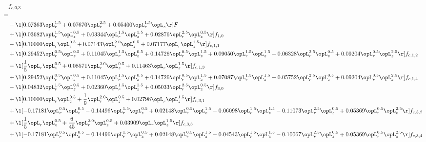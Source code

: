 \begin{alignat}{2} 
\label{eq:f_03_2} 
& f_{c,0,3} \nonumber \\ 
 = \\ 
& - \l[  0.07363 \opL_r^{1.5} +  0.07670 \opL_r^{2.5} +  0.05400 \opL_r^{1.5} \opL_z  \r] F \nonumber \\ 
& + \l[  0.03682 \opL_r^{1.5} \opL_z^{0.5} +  0.03344 \opL_r^{1.5} \opL_z^{1.5} +  0.02876 \opL_r^{2.5} \opL_z^{0.5}  \r] f_{1,0} \nonumber \\ 
& - \l[  0.10000 \opL_r \opL_z^{0.5} +  0.07143 \opL_r^{2.0} \opL_z^{0.5} +  0.07177 \opL_r \opL_z^{1.5}  \r] f_{c,1,1} \nonumber \\ 
& + \l[  0.29452 \opL_r^{0.5} \opL_z^{0.5} +  0.11045 \opL_r^{1.5} \opL_z^{0.5} +  0.14726 \opL_r^{0.5} \opL_z^{1.5} +  0.09050 \opL_r^{1.5} \opL_z^{1.5} +  0.06328 \opL_r^{2.5} \opL_z^{0.5} +  0.09204 \opL_r^{0.5} \opL_z^{2.5}  \r] f_{c,1,2} \nonumber \\ 
& - \l[ \frac{1}{5} \opL_r \opL_z^{0.5} +  0.08571 \opL_r^{2.0} \opL_z^{0.5} +  0.11463 \opL_r \opL_z^{1.5}  \r] f_{c,1,3} \nonumber \\ 
& + \l[  0.29452 \opL_r^{0.5} \opL_z^{0.5} +  0.11045 \opL_r^{1.5} \opL_z^{0.5} +  0.14726 \opL_r^{0.5} \opL_z^{1.5} +  0.07087 \opL_r^{1.5} \opL_z^{1.5} +  0.05752 \opL_r^{2.5} \opL_z^{0.5} +  0.09204 \opL_r^{0.5} \opL_z^{2.5}  \r] f_{c,1,4} \nonumber \\ 
& - \l[  0.04832 \opL_r^{1.5} \opL_z^{0.5} +  0.02360 \opL_r^{1.5} \opL_z^{1.5} +  0.05033 \opL_r^{2.5} \opL_z^{0.5}  \r] f_{3,0} \nonumber \\ 
& + \l[  0.10000 \opL_r \opL_z^{0.5} + \frac{1}{9} \opL_r^{2.0} \opL_z^{0.5} +  0.02798 \opL_r \opL_z^{1.5}  \r] f_{c,3,1} \nonumber \\ 
& + \l[  -0.17181 \opL_r^{0.5} \opL_z^{0.5}   -0.14496 \opL_r^{1.5} \opL_z^{0.5} +  0.02148 \opL_r^{0.5} \opL_z^{1.5}   -0.06098 \opL_r^{1.5} \opL_z^{1.5}   -0.11073 \opL_r^{2.5} \opL_z^{0.5} +  0.05369 \opL_r^{0.5} \opL_z^{2.5}  \r] f_{c,3,2} \nonumber \\ 
& + \l[ \frac{1}{5} \opL_r \opL_z^{0.5} + \frac{6}{45} \opL_r^{2.0} \opL_z^{0.5} +  0.03909 \opL_r \opL_z^{1.5}  \r] f_{c,3,3} \nonumber \\ 
& + \l[  -0.17181 \opL_r^{0.5} \opL_z^{0.5}   -0.14496 \opL_r^{1.5} \opL_z^{0.5} +  0.02148 \opL_r^{0.5} \opL_z^{1.5}   -0.04543 \opL_r^{1.5} \opL_z^{1.5}   -0.10067 \opL_r^{2.5} \opL_z^{0.5} +  0.05369 \opL_r^{0.5} \opL_z^{2.5}  \r] f_{c,3,4} \nonumber \\ 

\end{alignat}
